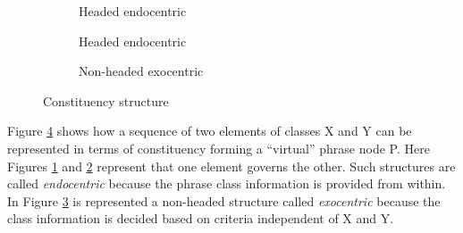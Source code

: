     \begin{figure}[!ht]
        \centering
        \begin{subfigure}{.33\textwidth}
            \centering
            \caption{Headed endocentric}
            \label{fig:stemma4-sub1}
        \end{subfigure}%
        \begin{subfigure}{.33\textwidth}
            \centering
            \caption{Headed endocentric}
            \label{fig:stemma4-sub2}
        \end{subfigure}
        \begin{subfigure}{.33\textwidth}
            \centering
        \caption{Non-headed exocentric}
        \label{fig:stemma4-sub3}    
        \end{subfigure}
        \caption{Constituency structure}
        \label{fig:stemma4}
    \end{figure}

    Figure \ref{fig:stemma4} shows how a sequence of two elements of classes X and Y can be represented in terms of constituency forming a ``virtual'' phrase node P. Here Figures \ref{fig:stemma4-sub1} and \ref{fig:stemma4-sub2} represent that one element governs the other. Such structures are called \textit{endocentric} because the phrase class information is provided from within. In Figure \ref{fig:stemma4-sub3} is represented a non-headed structure called \textit{exocentric} because the class information is decided based on criteria independent of X and Y. 
    
